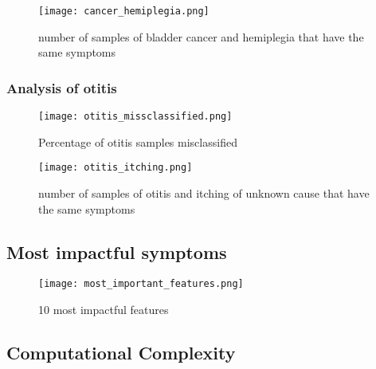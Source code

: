 \begin{figure}[H]
	\centering
	\texttt{[image: cancer\_hemiplegia.png]}
	\caption{number of samples of bladder cancer and hemiplegia that have the same symptoms}\label{fig:caner_hemiplegia}
\end{figure}
\noindent

\subsubsection*{Analysis of otitis}

\begin{figure}[H]
	\centering
	\texttt{[image: otitis\_missclassified.png]}
	\caption{Percentage of otitis samples misclassified}\label{fig:otitis_missclassified}
\end{figure}
\noindent
\begin{figure}[H]
	\centering
	\texttt{[image: otitis\_itching.png]}
	\caption{number of samples of otitis and itching of unknown cause that have the same symptoms}\label{fig:otitis_itching}
\end{figure}
\noindent

\subsection*{Most impactful symptoms}
\begin{figure}[H]
	\centering
	\texttt{[image: most\_important\_features.png]}
	\caption{10 most impactful features}\label{fig:most_important_features}
\end{figure}
\noindent

\subsection{Computational Complexity}




